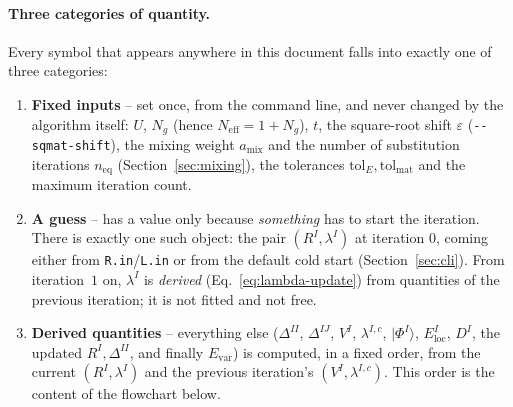 \documentclass[11pt]{article}
\newcommand{\Neff}{N_{\mathrm{eff}}}
\newcommand{\Ng}{N_{g}}
\begin{document}
\paragraph{Three categories of quantity.} Every symbol that appears anywhere
in this document falls into exactly one of three categories:
\begin{enumerate}
  \item \textbf{Fixed inputs} -- set once, from the command line, and never
    changed by the algorithm itself: $U$, $\Ng$ (hence $\Neff=1+\Ng$), $t$,
    the square-root shift $\varepsilon$ (\texttt{-{}-sqmat-shift}), the mixing
    weight $a_{\mathrm{mix}}$ and the number of substitution iterations
    $n_{\mathrm{eq}}$ (Section~\ref{sec:mixing}), the tolerances
    $\mathrm{tol}_E,\mathrm{tol}_{\mathrm{mat}}$ and the maximum iteration
    count.
  \item \textbf{A guess} -- has a value only because \emph{something} has to
    start the iteration. There is exactly one such object: the pair
    $(R^I,\lambda^I)$ at iteration $0$, coming either from
    \texttt{R.in}/\texttt{L.in} or from the default cold start
    (Section~\ref{sec:cli}). From iteration~$1$ on, $\lambda^I$ is
    \emph{derived} (Eq.~\eqref{eq:lambda-update}) from quantities of the
    previous iteration; it is not fitted and not free.
  \item \textbf{Derived quantities} -- everything else ($\Delta^{II}$,
    $\Delta^{IJ}$, $V^I$, $\lambda^{I,c}$, $|\Phi^I\rangle$, $E^I_{\mathrm{loc}}$,
    $D^I$, the updated $R^I,\Delta^{II}$, and finally $E_{\mathrm{var}}$) is
    computed, in a fixed order, from the current $(R^I,\lambda^I)$ and the
    previous iteration's $(V^I,\lambda^{I,c})$. This order is the content of
    the flowchart below.
\end{enumerate}
\end{document}
